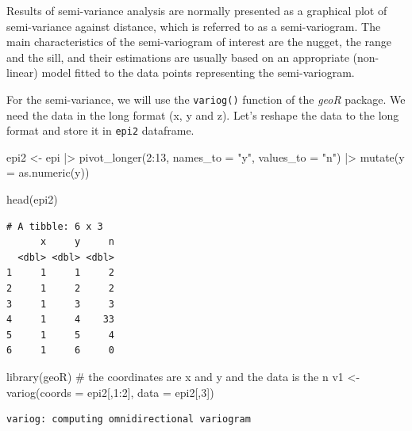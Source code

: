 \documentclass[
  letterpaper,
  DIV=11,
  numbers=noendperiod]{scrreprt}
\newenvironment{Shaded}{\begin{snugshade}}{\end{snugshade}}
\newcommand{\AttributeTok}[1]{\textcolor[rgb]{0.40,0.45,0.13}{#1}}
\newcommand{\CommentTok}[1]{\textcolor[rgb]{0.37,0.37,0.37}{#1}}
\newcommand{\DecValTok}[1]{\textcolor[rgb]{0.68,0.00,0.00}{#1}}
\newcommand{\FunctionTok}[1]{\textcolor[rgb]{0.28,0.35,0.67}{#1}}
\newcommand{\NormalTok}[1]{\textcolor[rgb]{0.00,0.23,0.31}{#1}}
\newcommand{\OtherTok}[1]{\textcolor[rgb]{0.00,0.23,0.31}{#1}}
\newcommand{\SpecialCharTok}[1]{\textcolor[rgb]{0.37,0.37,0.37}{#1}}
\newcommand{\StringTok}[1]{\textcolor[rgb]{0.13,0.47,0.30}{#1}}
\begin{document}
Results of semi-variance analysis are normally presented as a graphical
plot of semi-variance against distance, which is referred to as a
semi-variogram. The main characteristics of the semi-variogram of
interest are the nugget, the range and the sill, and their estimations
are usually based on an appropriate (non-linear) model fitted to the
data points representing the semi-variogram.

For the semi-variance, we will use the \texttt{variog()} function of the
\emph{geoR} package. We need the data in the long format (x, y and z).
Let's reshape the data to the long format and store it in \texttt{epi2}
dataframe.

\begin{Shaded}
\begin{Highlighting}[]
\NormalTok{epi2 }\OtherTok{\textless{}{-}}\NormalTok{ epi }\SpecialCharTok{|\textgreater{}}
  \FunctionTok{pivot\_longer}\NormalTok{(}\DecValTok{2}\SpecialCharTok{:}\DecValTok{13}\NormalTok{,}
               \AttributeTok{names\_to =} \StringTok{"y"}\NormalTok{,}
               \AttributeTok{values\_to =} \StringTok{"n"}\NormalTok{) }\SpecialCharTok{|\textgreater{}}
  \FunctionTok{mutate}\NormalTok{(}\AttributeTok{y =} \FunctionTok{as.numeric}\NormalTok{(y))}

\FunctionTok{head}\NormalTok{(epi2)}
\end{Highlighting}
\end{Shaded}

\begin{verbatim}
# A tibble: 6 x 3
      x     y     n
  <dbl> <dbl> <dbl>
1     1     1     2
2     1     2     2
3     1     3     3
4     1     4    33
5     1     5     4
6     1     6     0
\end{verbatim}

\begin{Shaded}
\begin{Highlighting}[]
\FunctionTok{library}\NormalTok{(geoR)}
\CommentTok{\# the coordinates are x and y and the data is the n}
\NormalTok{v1 }\OtherTok{\textless{}{-}} \FunctionTok{variog}\NormalTok{(}\AttributeTok{coords =}\NormalTok{ epi2[,}\DecValTok{1}\SpecialCharTok{:}\DecValTok{2}\NormalTok{], }\AttributeTok{data =}\NormalTok{ epi2[,}\DecValTok{3}\NormalTok{])}
\end{Highlighting}
\end{Shaded}

\begin{verbatim}
variog: computing omnidirectional variogram
\end{verbatim}
\end{document}
